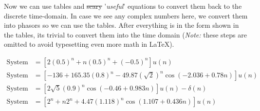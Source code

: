 \documentclass[]{report}
\begin{document}
Now we can use tables and \sout{scary} '\textit{useful}' equations to convert them back to the discrete time-domain. In case we see any complex numbers here, we convert them into phasors so we can use the tables. After everything is in the form shown in the tables, its trivial to convert them into the time domain (\textit{Note:} these steps are omitted to avoid typesetting even more math in \LaTeX).

\begin{align*}
	\text{System 1} &= \left[ 2(0.5)^n + n(0.5)^n +(-0.5)^n \right] u(n) \\
	\text{System 2} &= \left[ -136 + 165.35(0.8)^n - 49.87(\sqrt{2})^n\cos{(-2.036 + 0.78n)} \right] u(n) \\
	\text{System 3} &= \left[2\sqrt{5}(0.9)^n\cos{(-0.46 + 0.983n)} \right]u(n) - \delta(n) \\ 
	\text{System 4} &= \left[ 2^n + n2^n + 4.47(1.118)^n\cos{(1.107 + 0.436n)} \right] u(n)
\end{align*}
\end{document}
